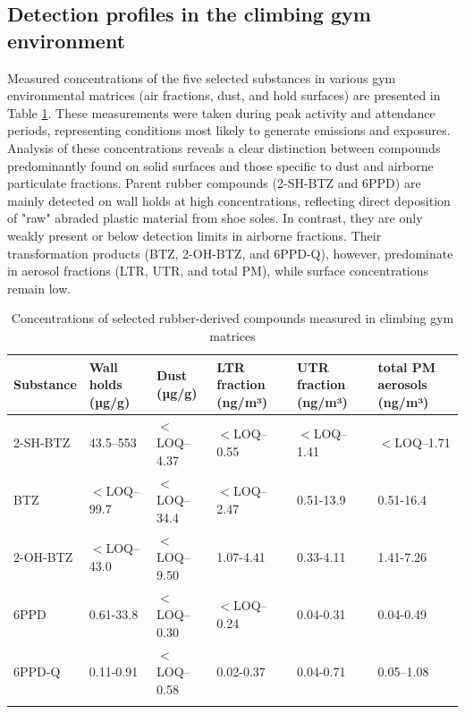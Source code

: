 \documentclass[pdflatex,sn-basic]{sn-jnl}%
\begin{document}
\subsection{Detection profiles in the climbing gym environment}
\label{subsec9}

Measured concentrations of the five selected substances in various gym environmental matrices (air fractions, dust, and hold surfaces) are presented in Table \ref{tab2}. These measurements were taken during peak activity and attendance periods, representing conditions most likely to generate emissions and exposures. Analysis of these concentrations reveals a clear distinction between compounds predominantly found on solid surfaces and those specific to dust and airborne particulate fractions. Parent rubber compounds (2-SH-BTZ and 6PPD) are mainly detected on wall holds at high concentrations, reflecting direct deposition of "raw" abraded plastic material from shoe soles. In contrast, they are only weakly present or below detection limits in airborne fractions. Their transformation products (BTZ, 2-OH-BTZ, and 6PPD-Q), however, predominate in aerosol fractions (LTR, UTR, and total PM), while surface concentrations remain low.

\begin{table}[hp]
\caption{Concentrations of selected rubber-derived compounds measured in climbing gym matrices}\label{tab2}%
\begin{tabularx}{\textwidth}{lXXXXX}
\toprule
Substance & Wall holds (µg/g)  & Dust (µg/g) & LTR fraction (ng/m³) & UTR fraction (ng/m³) & total PM aerosols (ng/m³)\\
\midrule
2-SH-BTZ    & 43.5–553   & $<$LOQ–4.37  & $<$LOQ–0.55 & $<$LOQ–1.41    & $<$LOQ–1.71  \\
BTZ    & $<$LOQ–99.7   & $<$LOQ–34.4  & $<$LOQ–2.47    & 0.51-13.9    & 0.51-16.4  \\
2-OH-BTZ    & $<$LOQ–43.0   & $<$LOQ–9.50 & 1.07-4.41    & 0.33-4.11    & 1.41-7.26     \\
6PPD    & 0.61-33.8    & $<$LOQ–0.30   & $<$LOQ–0.24 & 0.04-0.31  & 0.04-0.49  \\
6PPD-Q    & 0.11-0.91    & $<$LOQ–0.58 & 0.02-0.37 & 0.04-0.71  & 0.05–1.08  \\
\botrule
\end{tabularx}
\end{table}
\end{document}
